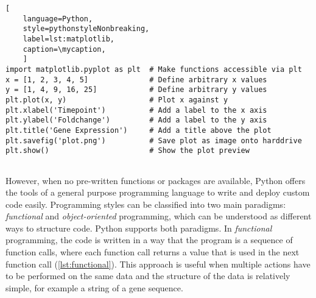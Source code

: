 \def\mycaption{ Example of using pre-written functions of a Python package. The
    functions of the package \texttt{matplotlib.pyplot} become accessable by
    importing the package as \texttt{plt}, where plt serves as an alias (or rather
    shortcut) to access the functions of the package. Then, two arbitrary lists are
    defined, \texttt{x} and \texttt{y}. These datapoints are plotted (scatterplot)
    using the function \texttt{plot} The plots x- and y-axes are then labeled and
    saved as an image. The code is written in a sequence of function calls, where
    the state of the plot is saved in the background. The plot is then displayed
    using the function \texttt{show}. }
\begin{lstlisting}[
    language=Python,
    style=pythonstyleNonbreaking,
    label=lst:matplotlib,
    caption=\mycaption,
    ]
import matplotlib.pyplot as plt  # Make functions accessible via plt
x = [1, 2, 3, 4, 5]              # Define arbitrary x values
y = [1, 4, 9, 16, 25]            # Define arbitrary y values
plt.plot(x, y)                   # Plot x against y
plt.xlabel('Timepoint')          # Add a label to the x axis
plt.ylabel('Foldchange')         # Add a label to the y axis
plt.title('Gene Expression')     # Add a title above the plot
plt.savefig('plot.png')          # Save plot as image onto harddrive
plt.show()                       # Show the plot preview
    
\end{lstlisting}

However, when no pre-written functions or packages are available, Python offers
the tools of a general purpose programming language to write and deploy custom
code easily. Programming styles can be classified into two main paradigms:
\emph{functional} and \emph{object-oriented} programming, which can be
understood as different ways to structure code. Python supports both paradigms.
In \emph{functional} programming, the code is written in a way that the program is a
sequence of function calls, where each function call returns a value that is
used in the next function call (\autoref{lst:functional}). This approach is
useful when multiple actions have to be performed on the same data and the
structure of the data is relatively simple, for example a string of a gene
sequence.

